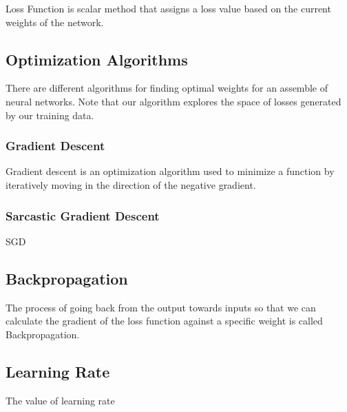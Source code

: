 \documentclass[a4paper,12pt]{article}
\begin{document}
\begin{tcolorbox}[colback=blue!5!white,colframe=blue!75!black,title=Loss Function]
  Loss Function is scalar method that assigns a loss value based on the current weights of the network.
\end{tcolorbox}

\subsection{Optimization Algorithms}

There are different algorithms for finding optimal weights for an assemble of neural networks. 
Note that our algorithm explores the space of losses generated by our training data.

\subsubsection{Gradient Descent}
\begin{tcolorbox}[colback=blue!5!white,colframe=blue!75!black,title=Gradient Descent]
  Gradient descent is an optimization algorithm used to minimize a function by iteratively moving 
  in the direction of the negative gradient.
\end{tcolorbox}

\subsubsection{Sarcastic Gradient Descent}
\begin{tcolorbox}[colback=blue!5!white,colframe=blue!75!black,title=Sarcastic Gradient Descent]
SGD 
\end{tcolorbox}


\subsection{Backpropagation}
The process of going back from the output towards inputs so that we can calculate the gradient of the 
loss function against a specific weight is called Backpropagation.

\subsection{Learning Rate}
The value of learning rate
\end{document}
